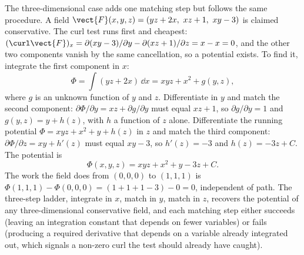 \begin{example}
The three-dimensional case adds one matching step but follows the same
procedure. A field $\vect{F}(x, y, z) = (yz + 2x,\ xz + 1,\ xy - 3)$
is claimed conservative. The curl test runs first and cheapest:
$(\curl\vect{F})_{x} = \partial(xy - 3)/\partial y - \partial(xz + 1)/
\partial z = x - x = 0$, and the other two components vanish by the
same cancellation, so a potential exists. To find it, integrate the
first component in $x$:
\[
\Phi = \int(yz + 2x)\,\dd x = xyz + x^{2} + g(y, z),
\]
where $g$ is an unknown function of $y$ and $z$. Differentiate in $y$
and match the second component: $\partial\Phi/\partial y = xz +
\partial g/\partial y$ must equal $xz + 1$, so $\partial g/\partial y
= 1$ and $g(y, z) = y + h(z)$, with $h$ a function of $z$ alone.
Differentiate the running potential $\Phi = xyz + x^{2} + y + h(z)$ in
$z$ and match the third component: $\partial\Phi/\partial z = xy +
h'(z)$ must equal $xy - 3$, so $h'(z) = -3$ and $h(z) = -3z + C$. The
potential is
\[
\Phi(x, y, z) = xyz + x^{2} + y - 3z + C.
\]
The work the field does from $(0, 0, 0)$ to $(1, 1, 1)$ is
$\Phi(1, 1, 1) - \Phi(0, 0, 0) = (1 + 1 + 1 - 3) - 0 = 0$, independent
of path. The three-step ladder, integrate in $x$, match in $y$, match
in $z$, recovers the potential of any three-dimensional conservative
field, and each matching step either succeeds (leaving an integration
constant that depends on fewer variables) or fails (producing a
required derivative that depends on a variable already integrated out,
which signals a non-zero curl the test should already have caught).
\end{example}

